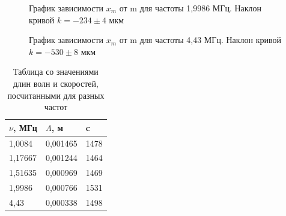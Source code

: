 \documentclass[a4paper,12pt]{article} %
\begin{document}
\begin{figure}[H]
  \caption{\centering График зависимости $x_{m}$ от m для частоты 1,9986 МГц. Наклон кривой $k = -234 \pm 4$ мкм
}
	\label{fig:image1}
\end{figure}
\begin{figure}[H]
  \caption{\centering График зависимости $x_{m}$ от m для частоты 4,43 МГц. Наклон кривой $k = -530 \pm 8$ мкм
}
	\label{fig:image1}
\end{figure}
\begin{table}[H]
\begin{tabular}{|l|l|l|}
\hline
$\nu$, МГц & $\Lambda$, м & c    \\ \hline
1,0084     & 0,001465     & 1478 \\ \hline
1,17667    & 0,001244     & 1464 \\ \hline
1,51635    & 0,000969     & 1469 \\ \hline
1,9986     & 0,000766     & 1531 \\ \hline
4,43       & 0,000338     & 1498 \\ \hline
\end{tabular}
\caption{\centering Таблица со значениями длин волн и скоростей,\\ посчитанными для разных частот}
\end{table}
\end{document}
